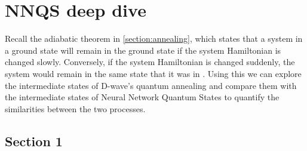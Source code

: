 \chapter{NNQS deep dive}
\label{anneal}

Recall the adiabatic theorem in \autoref{section:annealing}, which states that a system in a ground state will remain in the ground state if the system Hamiltonian is changed slowly. Conversely, if the system Hamiltonian is changed suddenly, the system would remain in the same state that it was in \cite{GriffithsSchroeter2018}. Using this we can explore the intermediate states of D-wave's quantum annealing and compare them with the intermediate states of Neural Network Quantum States to quantify the similarities between the two processes.

\section{Section 1}